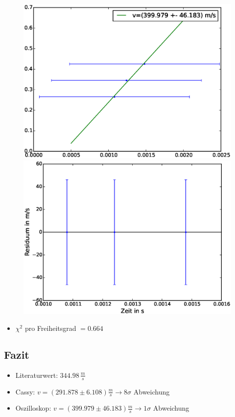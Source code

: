 \documentclass[11pt]{beamer}
\begin{document}
\begin{frame}
\begin{figure}[H]
\centering
\includegraphics[scale=0.3]{Bilder/Linreg-Oszi.eps}
\includegraphics[scale=0.3]{Bilder/Residuen-Oszi.eps}
\end{figure}
\begin{itemize}
\item $\chi^2$ pro Freiheitsgrad $=0.664$
\end{itemize}
\end{frame}
\subsection{Fazit}
\begin{frame}
\begin{itemize}
\item Literaturwert: $344.98 \, \frac{m}{s}$
\item Cassy: $v=(291.878 \pm 6.108) \frac{m}{s} \rightarrow 8\sigma$ Abweichung
\item Oszilloskop: $v=(399.979 \pm 46.183)\frac{m}{s}\rightarrow 1\sigma$ Abweichung
\end{itemize}
\end{frame}
\end{document}
